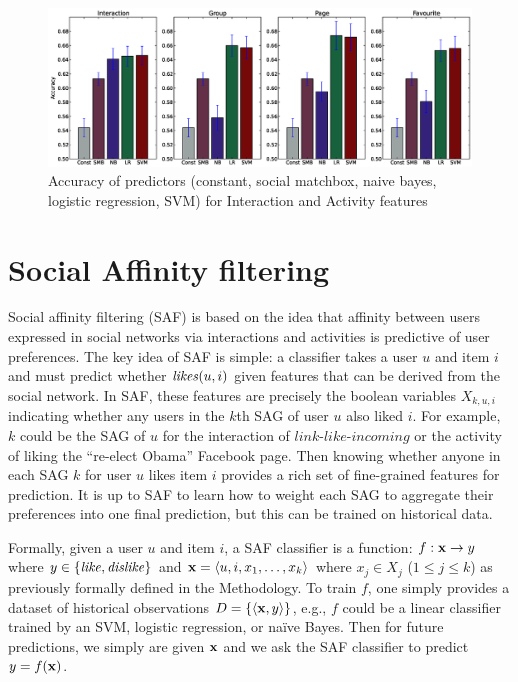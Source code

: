\begin{figure}[tbp!]
\hspace{-8mm}\includegraphics[width=230mm]{data/plots/accuracy/accuracy.eps}
\caption{ Accuracy of predictors (constant, social matchbox, naive bayes, logistic regression, SVM) for Interaction and Activity  features }
\label{Fig1}
\end{figure}

\section{Social Affinity filtering}

Social affinity filtering (SAF) is based on the idea that affinity
between users expressed in social networks via interactions and
activities is predictive of user preferences.  The key idea of SAF is
simple: a classifier takes a user $u$ and item $i$ and must predict
whether $\likes(u,i)$ given features that can be derived from the
social network.  In SAF, these features are precisely the boolean
variables $X_{k,u,i}$ indicating whether any users in the $k$th SAG of
user $u$ also liked $i$.  For example, $k$ could be the SAG of $u$ for
the interaction of $\textit{link-like-incoming}$ or the activity of
liking the ``re-elect Obama'' Facebook page.  Then knowing whether
anyone in each SAG $k$ for user $u$ likes item $i$ provides a rich set
of fine-grained features for prediction.  It is up to SAF to learn how
to weight each SAG to aggregate their preferences into one final
prediction, but this can be trained on historical data.

Formally, given a user $u$ and item $i$, a SAF classifier is a
function: $f: \x \to y$ where $y \in \{ \like, \dislike \}$ and $\x =
\langle u,i,x_1,\ldots,x_k \rangle$ where $x_j \in X_j$ ($1 \leq j
\leq k$) as previously formally defined in the Methodology.  To train $f$, one
simply provides a dataset of historical observations $D = \{ \langle
\x,y \rangle \}$, e.g., $f$ could be a linear classifier trained by an
SVM, logistic regression, or na\"{i}ve Bayes.  Then for future
predictions, we simply are given $\x$ and we ask the SAF classifier to
predict $y = f(\x)$.

